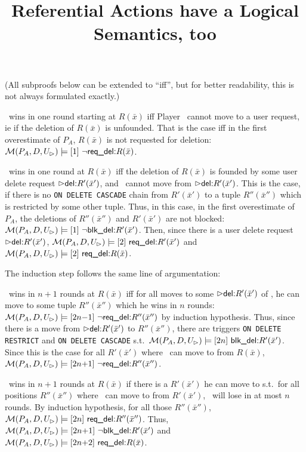 \documentclass[twoside,11pt]{article}
\theoremstyle{plain}
\def\rdel{\itorsf{req\_del:}}
\def\bdel{\itorsf{blk\_del:}}
\begin{document}
\title{\bf Referential Actions have a Logical Semantics, too}


\date{}
\maketitle 
\thispagestyle{empty}

\begin{Proposition}
  (All subproofs below can be extended to ``iff'', but for better
  readability, this is not always formulated exactly.)  

   \II\ wins in one round starting at $R(\bar x)$ iff Player \I\ 
  cannot move to a user request, ie if the deletion of
  $R(\bar x)$ is unfounded. That is the case iff in the first
  overestimate of $P_A$, $R(\bar x)$ is not requested for deletion:
  $\pl M(P_A,D,U_\rhd) \models \sterm{1}\ \neg \rdel R(\bar x)$.

  \I\ wins in one round at $R(\bar x)$ iff the deletion of 
 $R(\bar x)$ is founded by some user delete request 
 $\extev \del R'(\bar x')$, and  \II\ cannot move from
 $\extev \del R'(\bar x')$. This is the case, if there is no \texttt{ON
   DELETE CASCADE} chain from $R'(\bar x')$ to a tuple $R''(\bar x'')$
 which is restricted by some other tuple.
 Thus, in this case, in the first overestimate of $P_A$, the
 deletions of $R''(\bar x'')$ and $R'(\bar x')$ are not blocked:
 $\pl M(P_A,D,U_\rhd) \models \sterm{1}\ \neg \bdel R'(\bar x')$.
 Then, since there is a user delete request $\extev \del R'(\bar x')$,
 $\pl M(P_A,D,U_\rhd) \models \sterm{2}\ \rdel R'(\bar x')$ and
 $\pl M(P_A,D,U_\rhd) \models \sterm{2}\ \rdel R(\bar x)$.

 The induction step follows the same line of argumentation: 
 
 \II\ wins in $n{+}1$ rounds at $R(\bar x)$ iff for all moves to some
 $\extev \del R'(\bar x')$ of \I, he can move to some tuple $R''(\bar
 x'')$ which he wins in $n$ rounds: $\pl M(P_A,D,U_\rhd) \models
 \sterm{2n{-}1}\ \neg \rdel R''(\bar x'')$ by induction hypothesis.
 Thus, since there is a move from $\extev \del R'(\bar x')$ to $R''(\bar x'')$,
 there are triggers \texttt{ON DELETE RESTRICT} and \texttt{ON DELETE
   CASCADE} s.t.\ $\pl M(P_A,D,U_\rhd) \models \sterm{2n}\ \bdel
 R'(\bar x')$.  Since this is the case for all $R'(\bar x')$ where \I\ 
 can move to from $R(\bar x)$, $\pl M(P_A,D,U_\rhd) \models
 \sterm{2n{+}1}\ \neg \rdel R''(\bar x'')$.

  \I\ wins in $n{+}1$ rounds at $R(\bar x)$ if there is a
 $R'(\bar x')$ he can move to s.t.\ for all positions $R''(\bar x'')$
  where  \II\ can move to from $R'(\bar x')$,  \II\ will lose
 in at most $n$ rounds.
 By induction hypothesis, for all those $R''(\bar x'')$,
 $\pl M(P_A,D,U_\rhd) \models \sterm{2n}\ \rdel R''(\bar x'')$.
 Thus,
 $\pl M(P_A,D,U_\rhd) \models \sterm{2n{+}1}\ \neg \bdel R'(\bar x')$
 and
 $\pl M(P_A,D,U_\rhd) \models \sterm{2n{+}2}\ \rdel R(\bar x)$.
\end{Proposition}
\end{document}
